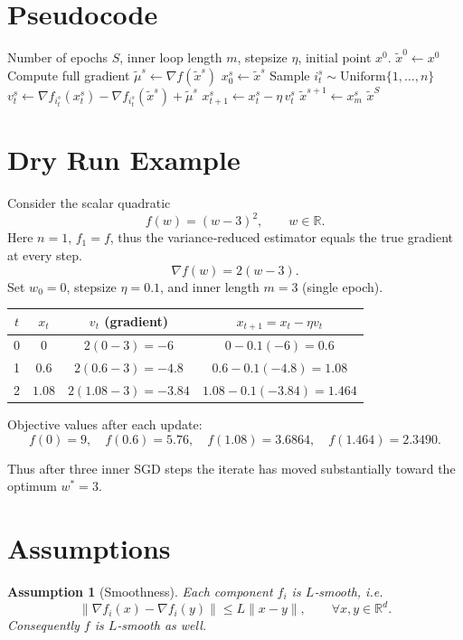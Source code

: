 \documentclass[11pt]{article}
\newtheorem{assumption}{Assumption}
\newcommand{\RR}{\mathbb{R}}
\begin{document}
\section*{Pseudocode}
\begin{algorithm}[H]
\caption{SVRG under PL condition}
\begin{algorithmic}[1]
\Require Number of epochs $S$, inner loop length $m$, stepsize $\eta$, initial point $x^{0}$.
\State $\tilde{x}^{0}\gets x^{0}$
    \State Compute full gradient $\tilde{\mu}^{s}\gets \nabla f(\tilde{x}^{s})$
    \State $x_{0}^{s}\gets \tilde{x}^{s}$
        \State Sample $i_{t}^{s}\sim\text{Uniform}\{1,\dots,n\}$
        \State $v_{t}^{s}\gets \nabla f_{i_{t}^{s}}(x_{t}^{s})-\nabla f_{i_{t}^{s}}(\tilde{x}^{s})+\tilde{\mu}^{s}$ 
        \State $x_{t+1}^{s}\gets x_{t}^{s}-\eta\,v_{t}^{s}$
    \EndFor
    \State $\tilde{x}^{s+1}\gets x_{m}^{s}$ 
\EndFor
\State \Return $\tilde{x}^{S}$
\end{algorithmic}
\end{algorithm}

\section*{Dry Run Example}
Consider the scalar quadratic
\[
f(w) = (w-3)^{2},\qquad w\in\RR.
\]
Here $n=1$, $f_{1}=f$, thus the variance‑reduced estimator equals the true gradient at every step.
\[
\nabla f(w)=2(w-3).
\]
Set $w_{0}=0$, stepsize $\eta=0.1$, and inner length $m=3$ (single epoch).

\medskip
\begin{tabular}{c|c|c|c}
$t$ & $x_{t}$ & $v_{t}$ (gradient) & $x_{t+1}=x_{t}-\eta v_{t}$\\\hline
0 & $0$ & $2(0-3)=-6$ & $0-0.1(-6)=0.6$\\
1 & $0.6$ & $2(0.6-3)=-4.8$ & $0.6-0.1(-4.8)=1.08$\\
2 & $1.08$ & $2(1.08-3)=-3.84$ & $1.08-0.1(-3.84)=1.464$\\
\end{tabular}

Objective values after each update:
\[
f(0)=9,\quad f(0.6)=5.76,\quad f(1.08)=3.6864,\quad f(1.464)=2.3490.
\]

Thus after three inner SGD steps the iterate has moved substantially toward the optimum $w^{*}=3$.

\section*{Assumptions}
\begin{assumption}[Smoothness]\label{ass:smooth}
Each component $f_i$ is $L$‑smooth, i.e.
\[
\|\nabla f_i(x)-\nabla f_i(y)\|\le L\|x-y\|,\qquad\forall x,y\in\RR^{d}.
\]
Consequently $f$ is $L$‑smooth as well.
\end{assumption}
\end{document}
